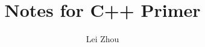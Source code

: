 \documentclass{article}
\begin{document}
\title{Notes for C++ Primer}
\author{Lei Zhou}
\maketitle




\end{document}
